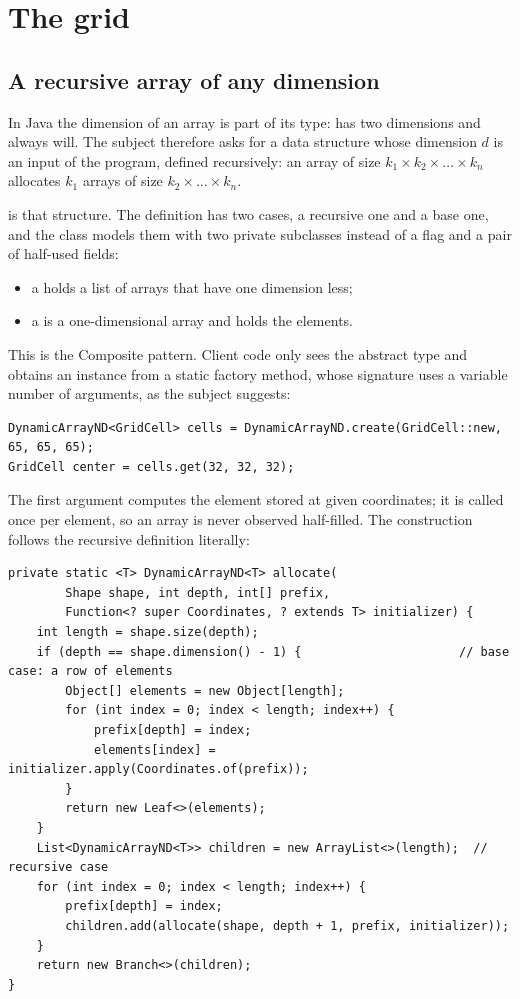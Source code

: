 \section{The grid}
\label{sec:grid}

\subsection{A recursive array of any dimension}

In Java the dimension of an array is part of its type:  has two dimensions and
always will. The subject therefore asks for a data structure whose dimension $d$ is an input of
the program, defined recursively: an array of size $k_1 \times k_2 \times \dots \times k_n$
allocates $k_1$ arrays of size $k_2 \times \dots \times k_n$.

 is that structure. The definition has two cases, a recursive one and a
base one, and the class models them with two private subclasses instead of a flag and a pair of
half-used fields:

\begin{itemize}
    \item a  holds a list of arrays that have one dimension less;
    \item a  is a one-dimensional array and holds the elements.
\end{itemize}

This is the Composite pattern. Client code only sees the abstract type and obtains an instance
from a static factory method, whose signature uses a variable number of arguments, as the subject
suggests:

\begin{lstlisting}
DynamicArrayND<GridCell> cells = DynamicArrayND.create(GridCell::new, 65, 65, 65);
GridCell center = cells.get(32, 32, 32);
\end{lstlisting}

The first argument computes the element stored at given coordinates; it is called once per
element, so an array is never observed half-filled. The construction follows the recursive
definition literally:

\begin{lstlisting}
private static <T> DynamicArrayND<T> allocate(
        Shape shape, int depth, int[] prefix,
        Function<? super Coordinates, ? extends T> initializer) {
    int length = shape.size(depth);
    if (depth == shape.dimension() - 1) {                      // base case: a row of elements
        Object[] elements = new Object[length];
        for (int index = 0; index < length; index++) {
            prefix[depth] = index;
            elements[index] = initializer.apply(Coordinates.of(prefix));
        }
        return new Leaf<>(elements);
    }
    List<DynamicArrayND<T>> children = new ArrayList<>(length);  // recursive case
    for (int index = 0; index < length; index++) {
        prefix[depth] = index;
        children.add(allocate(shape, depth + 1, prefix, initializer));
    }
    return new Branch<>(children);
}
\end{lstlisting}


